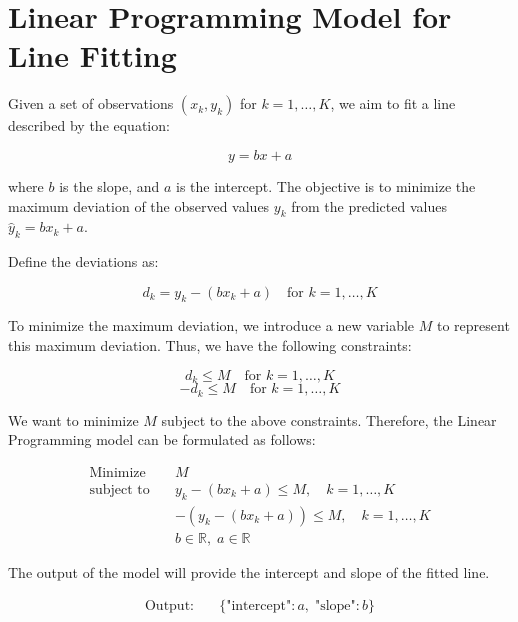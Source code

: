 \documentclass{article}
\begin{document}
\section*{Linear Programming Model for Line Fitting}

Given a set of observations \( (x_k, y_k) \) for \( k = 1, \ldots, K \), we aim to fit a line described by the equation:

\[
y = bx + a
\]

where \( b \) is the slope, and \( a \) is the intercept. The objective is to minimize the maximum deviation of the observed values \( y_k \) from the predicted values \( \hat{y}_k = bx_k + a \).

Define the deviations as:

\[
d_k = y_k - (bx_k + a) \quad \text{for } k = 1, \ldots, K
\]

To minimize the maximum deviation, we introduce a new variable \( M \) to represent this maximum deviation. Thus, we have the following constraints:

\[
d_k \leq M \quad \text{for } k = 1, \ldots, K
\]
\[
-d_k \leq M \quad \text{for } k = 1, \ldots, K
\]

We want to minimize \( M \) subject to the above constraints. Therefore, the Linear Programming model can be formulated as follows:

\begin{align*}
\text{Minimize} \quad & M \\
\text{subject to} \quad & y_k - (bx_k + a) \leq M, \quad k = 1, \ldots, K \\
& -(y_k - (bx_k + a)) \leq M, \quad k = 1, \ldots, K \\
& b \in \mathbb{R}, \; a \in \mathbb{R}
\end{align*}

The output of the model will provide the intercept and slope of the fitted line.

\begin{align*}
\text{Output:} \quad & \{ \text{"intercept"}: a, \; \text{"slope"}: b \}
\end{align*}
\end{document}
